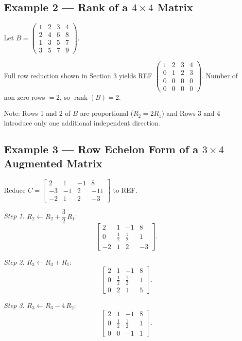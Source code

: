 \documentclass[12pt,a4paper]{article}
\begin{document}
\subsection*{Example 2 --- Rank of a $4\times4$ Matrix}

Let $B = \begin{pmatrix}1&2&3&4\\2&4&6&8\\1&3&5&7\\3&5&7&9\end{pmatrix}$.

Full row reduction shown in Section 3 yields REF $\begin{pmatrix}1&2&3&4\\0&1&2&3\\0&0&0&0\\0&0&0&0\end{pmatrix}$.
Number of non-zero rows $= 2$, so $\operatorname{rank}(B) = 2$.

Note: Rows 1 and 2 of $B$ are proportional ($R_2 = 2R_1$) and Rows 3 and 4 introduce only one additional independent direction.

\subsection*{Example 3 --- Row Echelon Form of a $3\times4$ Augmented Matrix}

Reduce $C = \left[\begin{array}{ccc|c}2&1&-1&8\\-3&-1&2&-11\\-2&1&2&-3\end{array}\right]$ to REF.

\textit{Step 1.} $R_2 \leftarrow R_2 + \dfrac{3}{2}\,R_1$:
\[
\left[\begin{array}{ccc|c}2&1&-1&8\\0&\tfrac{1}{2}&\tfrac{1}{2}&1\\-2&1&2&-3\end{array}\right].
\]

\textit{Step 2.} $R_3 \leftarrow R_3 + R_1$:
\[
\left[\begin{array}{ccc|c}2&1&-1&8\\0&\tfrac{1}{2}&\tfrac{1}{2}&1\\0&2&1&5\end{array}\right].
\]

\textit{Step 3.} $R_3 \leftarrow R_3 - 4\,R_2$:
\[
\left[\begin{array}{ccc|c}2&1&-1&8\\0&\tfrac{1}{2}&\tfrac{1}{2}&1\\0&0&-1&1\end{array}\right].
\]
\end{document}
